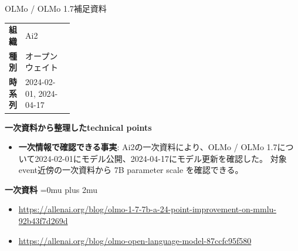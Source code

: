 \Needspace{0.38\textheight}
\begin{technicalnote}{OLMo / OLMo 1.7}{補足資料}
\begingroup
\begin{tabularx}{\linewidth}{@{}>{\bfseries}p{0.22\linewidth}X@{}}
組織 & Ai2 \\
種別 & オープンウェイト \\
時系列 & 2024-02-01, 2024-04-17 \\
\end{tabularx}
\smallskip
\begin{minipage}{\linewidth}
{\bfseries 一次資料から整理したtechnical points}
\begin{itemize}[leftmargin=1.5em,itemsep=0.35em]
\item \textbf{一次情報で確認できる事実}: Ai2の一次資料により、OLMo / OLMo 1.7について2024-02-01にモデル公開、2024-04-17にモデル更新を確認した。 対象event近傍の一次資料から 7B parameter scale を確認できる。
\end{itemize}
\begin{minipage}{\linewidth}
\begin{samepage}
{\bfseries 一次資料}
\begingroup\sloppy
\Urlmuskip=0mu plus 2mu\relax
\begin{itemize}[leftmargin=1.5em,itemsep=0.25em]
\item {\scriptsize\url{https://allenai.org/blog/olmo-1-7-7b-a-24-point-improvement-on-mmlu-92b43f7d269d}}
\item {\scriptsize\url{https://allenai.org/blog/olmo-open-language-model-87ccfc95f580}}
\end{itemize}
\endgroup
\end{samepage}
\end{minipage}
\end{minipage}
\endgroup
\end{technicalnote}
\medskip
